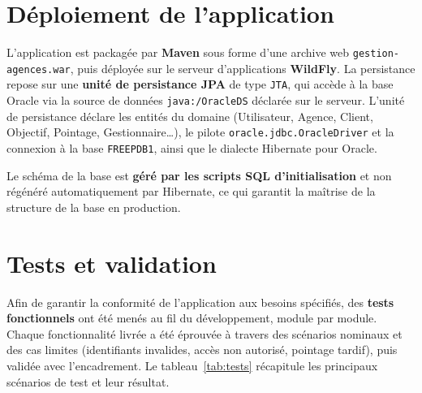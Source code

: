\section{Déploiement de l'application}
L'application est packagée par \textbf{Maven} sous forme d'une archive web
\texttt{gestion-agences.war}, puis déployée sur le serveur d'applications
\textbf{WildFly}. La persistance repose sur une \textbf{unité de persistance JPA}
de type \texttt{JTA}, qui accède à la base Oracle via la source de données
\texttt{java:/OracleDS} déclarée sur le serveur. L'unité de persistance déclare
les entités du domaine (Utilisateur, Agence, Client, Objectif, Pointage,
Gestionnaire\ldots), le pilote \texttt{oracle.jdbc.OracleDriver} et la connexion à
la base \texttt{FREEPDB1}, ainsi que le dialecte Hibernate pour Oracle.

Le schéma de la base est \textbf{géré par les scripts SQL d'initialisation} et non
régénéré automatiquement par Hibernate, ce qui garantit la maîtrise de la
structure de la base en production.

\section{Tests et validation}
Afin de garantir la conformité de l'application aux besoins spécifiés, des
\textbf{tests fonctionnels} ont été menés au fil du développement, module par
module. Chaque fonctionnalité livrée a été éprouvée à travers des scénarios
nominaux et des cas limites (identifiants invalides, accès non autorisé, pointage
tardif), puis validée avec l'encadrement. Le tableau~\ref{tab:tests} récapitule
les principaux scénarios de test et leur résultat.


